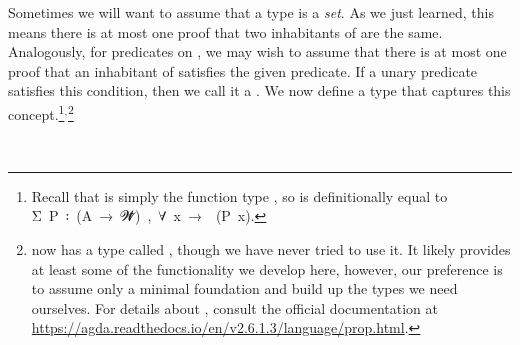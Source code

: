 Sometimes we will want to assume that a type  is a \emph{set}. As we just learned, this means there is at most one proof that two inhabitants of  are the same. Analogously, for predicates on , we may wish to assume that there is at most one proof that an inhabitant of  satisfies the given predicate. If a unary predicate satisfies this condition, then we call it a . We now define a type that captures this concept.\footnote{Recall that  is simply the function type , so  is definitionally equal to \af Σ~\ab P~\af ꞉~(\ab A~\as →~\ab 𝓦\af ̇)~\af ,~\as ∀~\ab x~\as →~~(\ab P~\ab x).
}$^, $\footnote{\agda now has a type called \proptype, though we have never tried to use it. It likely provides at least some of the functionality we develop here, however, our preference is to assume only a minimal \mltt foundation and build up the types we need ourselves. For details about \proptype, consult the official documentation at \url{https://agda.readthedocs.io/en/v2.6.1.3/language/prop.html}.}
\ccpad
\begin{code}%
\>[1]\AgdaSpace{}%
\AgdaSymbol{:}\AgdaSpace{}%
\AgdaSpace{}%
\AgdaSpace{}%
\AgdaSpace{}%
\AgdaSymbol{(}\AgdaSpace{}%
\AgdaSymbol{:}\AgdaSpace{}%
\AgdaSymbol{)}\AgdaSpace{}%
\AgdaSpace{}%
\AgdaSpace{}%
\AgdaSpace{}%
\AgdaSpace{}%
\AgdaSpace{}%
\<%
\\
%
\>[1]\AgdaSpace{}%
\AgdaSpace{}%
\AgdaSpace{}%
\AgdaSymbol{=}\AgdaSpace{}%
\AgdaSpace{}%
\AgdaSpace{}%
\AgdaSpace{}%
\AgdaSymbol{(}\AgdaSpace{}%
\AgdaSpace{}%
\AgdaSymbol{)}\AgdaSpace{}%
\AgdaFunction{,}\AgdaSpace{}%
\AgdaSpace{}%
\AgdaSpace{}%
\AgdaSpace{}%
\AgdaSpace{}%
\AgdaSymbol{(}\AgdaSpace{}%
\AgdaSymbol{)}\<%
\end{code}
\scpad

